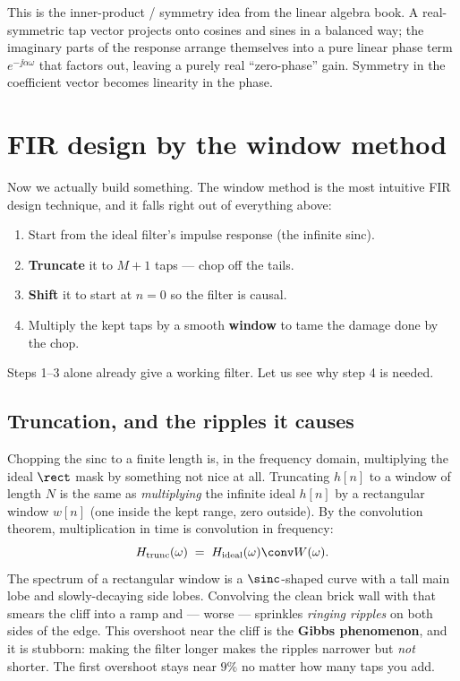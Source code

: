 \begin{connectionbox}
This is the inner-product / symmetry idea from the linear algebra book. A
real-symmetric tap vector projects onto cosines and sines in a balanced way; the
imaginary parts of the response arrange themselves into a pure linear phase term
$e^{-\jj\alpha\omega}$ that factors out, leaving a purely real ``zero-phase''
gain. Symmetry in the coefficient vector becomes linearity in the phase.
\end{connectionbox}

\section{FIR design by the window method}
\label{ch16:window}

Now we actually build something. The window method is the most intuitive FIR
design technique, and it falls right out of everything above:

\begin{enumerate}
\item Start from the ideal filter's impulse response (the infinite sinc).
\item \textbf{Truncate} it to $M+1$ taps --- chop off the tails.
\item \textbf{Shift} it to start at $n=0$ so the filter is causal.
\item Multiply the kept taps by a smooth \textbf{window} to tame the damage done by
the chop.
\end{enumerate}

Steps 1--3 alone already give a working filter. Let us see why step 4 is needed.

\subsection{Truncation, and the ripples it causes}
\label{ch16:gibbs}

Chopping the sinc to a finite length is, in the frequency domain, multiplying the
ideal $\rect$ mask by something not nice at all. Truncating $h[n]$ to a window of
length $N$ is the same as \emph{multiplying} the infinite ideal $h[n]$ by a
rectangular window $w[n]$ (one inside the kept range, zero outside). By the
convolution theorem, multiplication in time is convolution in frequency:
\[
H_{\text{trunc}}(\omega) \;=\; H_{\text{ideal}}(\omega) \conv W(\omega).
\]
The spectrum of a rectangular window is a $\sinc$-shaped curve with a tall main
lobe and slowly-decaying side lobes. Convolving the clean brick wall with that
smears the cliff into a ramp and --- worse --- sprinkles \emph{ringing ripples} on
both sides of the edge. This overshoot near the cliff is the \textbf{Gibbs
phenomenon}, and it is stubborn: making the filter longer makes the ripples
narrower but \emph{not} shorter. The first overshoot stays near $9\%$ no matter
how many taps you add.

